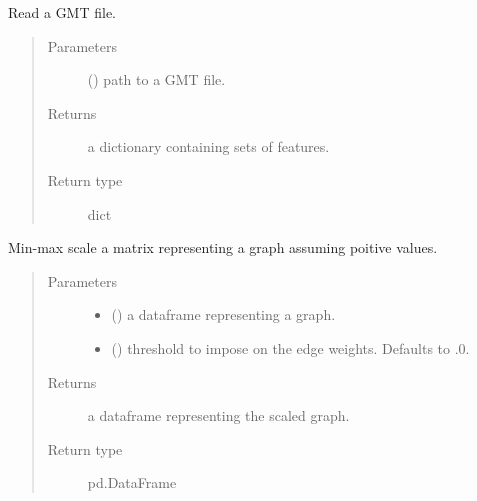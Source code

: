 \documentclass[letterpaper,10pt,english]{sphinxmanual}
\begin{document}

\begin{fulllineitems}
\label{\detokenize{_modules/cosifer.utils:cosifer.utils.data.read_gmt}}
Read a GMT file.
\begin{quote}\begin{description}
\item[{Parameters}] \leavevmode
{} () \textendash{} path to a GMT file.

\item[{Returns}] \leavevmode
a dictionary containing sets of features.

\item[{Return type}] \leavevmode
dict

\end{description}\end{quote}

\end{fulllineitems}


\begin{fulllineitems}
\label{\detokenize{_modules/cosifer.utils:cosifer.utils.data.scale_graph}}
Min-max scale a matrix representing a graph assuming poitive values.
\begin{quote}\begin{description}
\item[{Parameters}] \leavevmode\begin{itemize}
\item {} 
 () \textendash{} a dataframe representing a graph.

\item {} 
 (\sphinxstyleliteralemphasis{\sphinxupquote{, }}) \textendash{} threshold to impose on the edge weights.
Defaults to .0.

\end{itemize}

\item[{Returns}] \leavevmode
a dataframe representing the scaled graph.

\item[{Return type}] \leavevmode
pd.DataFrame

\end{description}\end{quote}

\end{fulllineitems}
\end{document}
